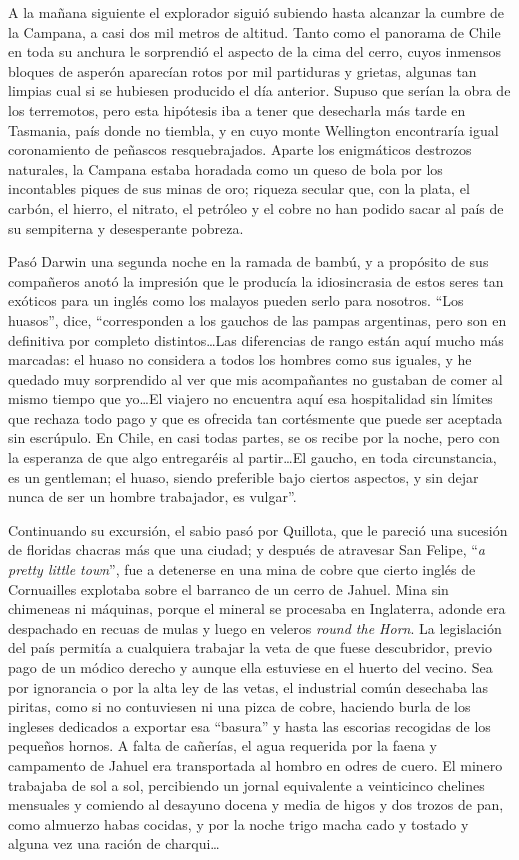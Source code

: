 \documentclass[10pt,twoside,openright]{memoir}
\begin{document}
A la mañana siguiente el explorador siguió subiendo hasta alcanzar la
cumbre de la Campana, a casi dos mil metros de altitud. Tanto como el
panorama de Chile en toda su anchura le sorprendió el aspecto de la cima
del cerro, cuyos inmensos bloques de asperón aparecían rotos por mil
partiduras y grietas, algunas tan limpias cual si se hubiesen producido
el día anterior. Supuso que serían
la obra de los terremotos, pero esta hipótesis iba a tener que
desecharla más tarde en Tasmania, país donde no tiembla, y en cuyo monte
Wellington encontraría igual coronamiento de peñascos resquebrajados.
Aparte los enigmáticos destrozos naturales, la Campana estaba horadada
como un queso de bola por los incontables piques de sus minas de oro;
riqueza secular que, con la plata, el carbón, el hierro, el nitrato, el
petróleo y el cobre no han podido sacar al país de su sempiterna y
desesperante pobreza.

Pasó Darwin una segunda noche en la ramada de bambú, y a propósito de
sus compañeros anotó la impresión que le producía la idiosincrasia de
estos seres tan exóticos para un
inglés como los malayos pueden serlo para nosotros. ``Los huasos'', dice,
``corresponden a los gauchos de las pampas argentinas, pero son en
definitiva por completo distintos\ldots Las diferencias de rango están aquí
mucho más marcadas: el huaso no considera a todos los hombres como sus
iguales, y he quedado muy
sorprendido al ver que mis
acompañantes no gustaban de comer al
mismo tiempo que yo\ldots El viajero no encuentra aquí esa hospitalidad sin
límites que rechaza todo pago y que es ofrecida tan cortésmente que
puede ser aceptada sin escrúpulo. En Chile, en casi todas partes, se os
recibe por la noche, pero con la esperanza de que algo entregaréis al
partir\ldots El gaucho, en toda circunstancia, es un gentleman; el huaso,
siendo preferible bajo ciertos aspectos, y sin dejar nunca de ser un
hombre trabajador, es vulgar''.

Continuando su excursión, el sabio pasó por Quillota, que le pareció una
sucesión de floridas chacras más que una ciudad; y después de atravesar
San Felipe, ``\emph{a pretty little town}'', fue a detenerse en una
mina de cobre que cierto inglés de
Cornuailles explotaba sobre el barranco de un cerro de Jahuel. Mina sin
chimeneas ni máquinas, porque el mineral se procesaba en Inglaterra,
adonde era despachado en recuas de mulas y luego en veleros \emph{round
the Horn}. La legislación del país permitía a cualquiera trabajar la
veta de que fuese descubridor, previo pago de un módico derecho y aunque
ella estuviese en el huerto del vecino. Sea por ignorancia o por la alta
ley de las vetas, el industrial común desechaba las piritas, como si no
contuviesen ni una pizca de cobre, haciendo burla de los ingleses
dedicados a exportar esa ``basura'' y hasta las escorias recogidas de los
pequeños hornos. A falta de cañerías, el agua requerida por la faena y
campamento de Jahuel era transportada al
 hombro en odres de cuero. El minero
trabajaba de sol a sol, percibiendo un jornal equivalente a veinticinco
chelines mensuales y comiendo al desayuno docena y media de higos y dos
trozos de pan, como almuerzo habas cocidas, y por la noche trigo
macha cado y tostado y alguna vez
una ración de charqui\ldots
\end{document}

